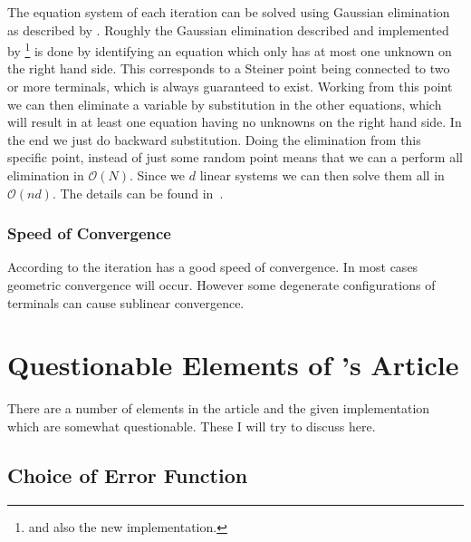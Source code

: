 The equation system of each iteration can be solved using Gaussian elimination
as described by \textcite[p.~148--149]{smith1992}. Roughly the Gaussian
elimination described and implemented by \citeauthor{smith1992}\footnote{and
  also the new implementation.} is done by identifying an equation which only
has at most one unknown on the right hand side. This corresponds to a Steiner
point being connected to two or more terminals, which is always guaranteed to
exist. Working from this point we can then eliminate a variable by substitution
in the other equations, which will result in at least one equation having no
unknowns on the right hand side. In the end we just do backward substitution.
Doing the elimination from this specific point, instead of just some random
point means that we can a perform all elimination in $\mathcal O(N)$. Since we
$d$ linear systems we can then solve them all in $\mathcal{O}(n d)$. The details
can be found in~\cite[p.~148--149]{smith1992}.

\subsubsection{Speed of Convergence}
\label{sec:speed-convergence}

According to \textcite[p.~150]{smith1992} the iteration has a good speed of
convergence. In most cases geometric convergence will occur. However some
degenerate configurations of terminals can cause sublinear convergence.

\section{Questionable Elements of \citeauthor{smith1992}'s Article}
\label{sec:quest-elem-smiths}

There are a number of elements in the article and the given
implementation~\cite{smith1992} which are somewhat questionable. These I will
try to discuss here.

\subsection{Choice of Error Function}
\label{sec:choice-error-funct}

